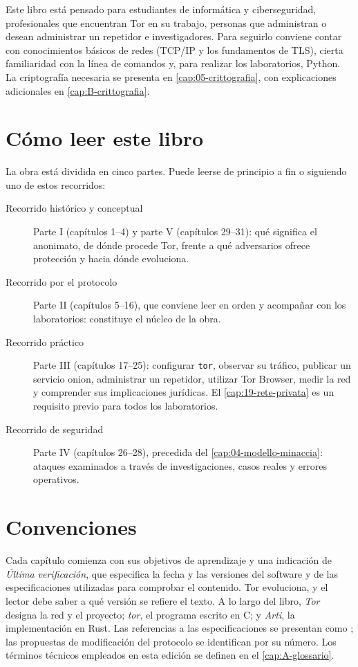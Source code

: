 Este libro está pensado para estudiantes de informática y ciberseguridad, profesionales que encuentran Tor en su trabajo, personas que administran o desean administrar un repetidor e investigadores. Para seguirlo conviene contar con conocimientos básicos de redes (TCP/IP y los fundamentos de TLS), cierta familiaridad con la línea de comandos y, para realizar los laboratorios, Python. La criptografía necesaria se presenta en \cref{cap:05-crittografia}, con explicaciones adicionales en \cref{cap:B-crittografia}.

\section*{Cómo leer este libro}

La obra está dividida en cinco partes. Puede leerse de principio a fin o siguiendo uno de estos recorridos:
\begin{description}
  \item[Recorrido histórico y conceptual] Parte I (capítulos 1--4) y parte V (capítulos 29--31): qué significa el anonimato, de dónde procede Tor, frente a qué adversarios ofrece protección y hacia dónde evoluciona.
  \item[Recorrido por el protocolo] Parte II (capítulos 5--16), que conviene leer en orden y acompañar con los laboratorios: constituye el núcleo de la obra.
  \item[Recorrido práctico] Parte III (capítulos 17--25): configurar \texttt{tor}, observar su tráfico, publicar un servicio onion, administrar un repetidor, utilizar Tor Browser, medir la red y comprender sus implicaciones jurídicas. El \cref{cap:19-rete-privata} es un requisito previo para todos los laboratorios.
  \item[Recorrido de seguridad] Parte IV (capítulos 26--28), precedida del \cref{cap:04-modello-minaccia}: ataques examinados a través de investigaciones, casos reales y errores operativos.
\end{description}

\section*{Convenciones}

Cada capítulo comienza con sus objetivos de aprendizaje y una indicación de \emph{Última verificación}, que especifica la fecha y las versiones del software y de las especificaciones utilizadas para comprobar el contenido. Tor evoluciona, y el lector debe saber a qué versión se refiere el texto. A lo largo del libro, \emph{Tor} designa la red y el proyecto; \emph{tor}, el programa escrito en C; y \emph{Arti}, la implementación en Rust. Las referencias a las especificaciones se presentan como ; las propuestas de modificación del protocolo se identifican por su número. Los términos técnicos empleados en esta edición se definen en el \cref{cap:A-glossario}.

